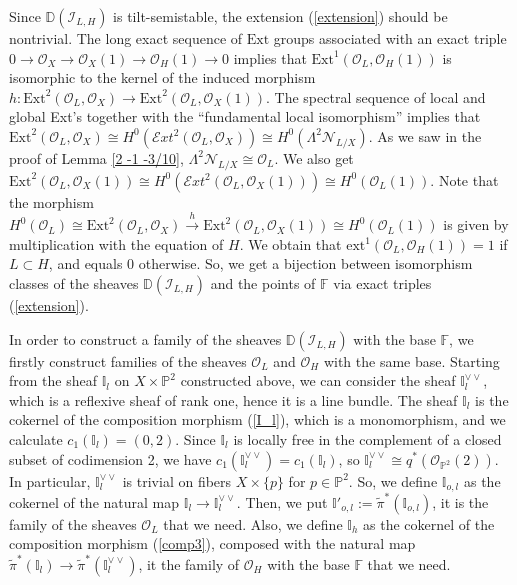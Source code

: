 \documentclass{amsart}
\begin{document}
\begin{enumerate}
Since $\mathbb D(\mathcal I_{L,H})$ is tilt-semistable, the extension (\ref{extension}) should be nontrivial. The long exact sequence of $\mathrm{Ext}$ groups associated with an exact triple $0\to\mathcal O_X\to\mathcal O_X(1)\to\mathcal O_H(1)\to 0$ implies that $\mathrm{Ext}^1(\mathcal O_L,\mathcal O_H(1))$ is isomorphic to the kernel of the induced morphism $h:\mathrm{Ext}^2(\mathcal O_L,\mathcal O_X)\to\mathrm{Ext}^2(\mathcal O_L,\mathcal O_X(1))$. The spectral sequence of local and global Ext's together with the ``fundamental local isomorphism'' \cite[Theorem 4.5]{AK} implies that $\mathrm{Ext}^2(\mathcal O_L,\mathcal O_X)\cong H^0(\mathcal Ext^2(\mathcal O_L,\mathcal O_X))\cong H^0(\Lambda^2\mathcal N_{L/X})$. 
As we saw in the proof of Lemma \ref{2 -1 -3/10}, $\Lambda^2\mathcal N_{L/X}\cong\mathcal O_L$. We also get $\mathrm{Ext}^2(\mathcal O_L,\mathcal O_X(1))\cong H^0(\mathcal Ext^2(\mathcal O_L,\mathcal O_X(1)))\cong H^0(\mathcal O_L(1))$. Note that the morphism $H^0(\mathcal O_L)\cong\mathrm{Ext}^2(\mathcal O_L,\mathcal O_X)\overset{h}{\to}\mathrm{Ext}^2(\mathcal O_L,\mathcal O_X(1))\cong H^0(\mathcal O_L(1))$ is given by multiplication with the equation of $H$. We obtain that $\mathrm{ext}^1(\mathcal O_L,\mathcal O_H(1))=1$ if $L\subset H$, and equals $0$ otherwise. So, we get a bijection between isomorphism classes of the sheaves $\mathbb D(\mathcal I_{L,H})$ and the points of $\mathbb F$ via exact triples (\ref{extension}). 

In order to construct a family of the sheaves $\mathbb D(\mathcal I_{L,H})$ with the base $\mathbb F$, we firstly construct families of the sheaves $\mathcal O_L$ and $\mathcal O_H$ with the same base. Starting from the sheaf $\mathbb I_l$ on $X\times\mathbb P^2$ constructed above, we can consider the sheaf $\mathbb I_l^{\vee\vee}$, which is a reflexive sheaf of rank one, hence it is a line bundle. The sheaf $\mathbb I_l$ is the cokernel of the composition morphism (\ref{I_l}), which is a monomorphism, and we calculate $c_1(\mathbb I_l)=(0,2)$. Since $\mathbb I_l$ is locally free in the complement of a closed subset of codimension 2, we have $c_1(\mathbb I_l^{\vee\vee})=c_1(\mathbb I_l)$, so $\mathbb I_l^{\vee\vee}\cong q^*(\mathcal O_{\mathbb P^2}(2))$. In particular, $\mathbb I_l^{\vee\vee}$ is trivial on fibers $X\times\{p\}$ for $p\in\mathbb P^2$. So, we define $\mathbb I_{o,l}$ as the cokernel of the natural map $\mathbb I_l\to\mathbb I_l^{\vee\vee}$. Then, we put $\mathbb I'_{o,l}:=\widetilde{\pi}^*(\mathbb I_{o,l})$, it is the family of the sheaves $\mathcal O_L$ that we need. Also, we define $\mathbb I_h$ as the cokernel of the composition morphism (\ref{comp3}), composed with the natural map $\widetilde{\pi}^*(\mathbb I_l)\to\widetilde{\pi}^*(\mathbb I_l^{\vee\vee})$, it the family of $\mathcal O_H$ with the base $\mathbb F$ that we need.


\end{enumerate}
\end{document}
